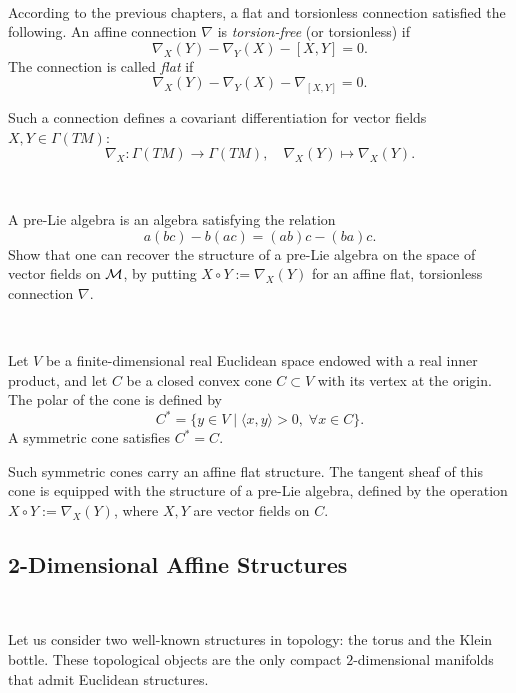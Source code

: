 \,

According to the previous chapters, a flat and torsionless connection satisfied the following. 
An affine connection $\nabla$ is {\it torsion-free} (or torsionless) if
\begin{equation}\label{E:1}
\nabla_X (Y) - \nabla_Y (X) - [X, Y] = 0.
\end{equation}
The connection is called {\it flat} if
\begin{equation}\label{E:2}
\nabla_X (Y) - \nabla_Y (X) - \nabla_{[X, Y]} = 0.
\end{equation}

Such a connection defines a covariant differentiation for vector fields $X, Y \in \Gamma(TM)$:
\[
\nabla_X: \Gamma(TM) \longrightarrow \Gamma(TM), \quad 
\nabla_X(Y) \longmapsto \nabla_X(Y).
\]

\,

\begin{ex}\label{Ex:preLie}
A pre-Lie algebra is an algebra satisfying the relation 
\[
a(bc) - b(ac) = (ab)c - (ba)c.
\]    
Show that one can recover the structure of a pre-Lie algebra on the space of vector fields on $\mathcal{M}$, by putting  $X \circ Y := \nabla_X(Y)$ for an affine flat, torsionless connection $\nabla$.
\end{ex}


\,


\begin{example}
Let $V$ be a finite-dimensional real Euclidean space endowed with a real inner product, and let $C$ be a closed convex cone $C \subset V $ with its vertex at the origin. The polar of the cone is defined by
\[
C^* = \{ y \in V \; | \; \langle x, y \rangle > 0, \; \forall x \in C \}.
\]
A symmetric cone satisfies $C^* = C $.

Such symmetric cones carry an affine flat structure. The tangent sheaf of this cone is equipped with the structure of a pre-Lie algebra, defined by the operation $X \circ Y := \nabla_X(Y) $, where $X, Y $ are vector fields on $C$.
\end{example}

\subsection{2-Dimensional Affine Structures}

\,

Let us consider two well-known structures in topology: the torus and the Klein bottle. These topological objects are the only compact $2$-dimensional manifolds that admit Euclidean structures.

